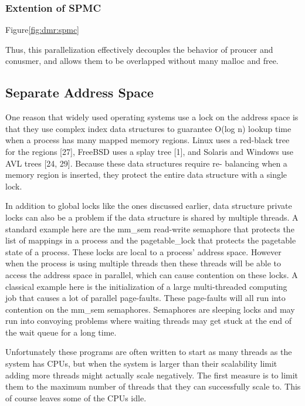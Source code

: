 \subsubsection{Extention of SPMC}
Figure\ref{fig:dmr:spmc}

Thus, this parallelization effectively decouples the behavior of proucer and conusmer, and allows them to be overlapped 
without many malloc and free.




\subsection{Separate Address Space}

One reason that widely used operating systems use a lock on the address space is that 
they use complex index data structures to guarantee O(log n)
lookup time when a process has many mapped memory
regions. Linux uses a red-black tree for the regions [27],
FreeBSD uses a splay tree [1], and Solaris and Windows use
AVL trees [24, 29]. 
Because these data structures require re-
balancing when a memory region is inserted, they protect the
entire data structure with a single lock.


In addition to global locks like the ones discussed earlier, 
data structure private locks can also be a problem 
if the data structure is shared by multiple threads. 
A standard example here are the mm\_sem read-write semaphore 
that protects the list of mappings in a process and 
the pagetable\_lock that protects the pagetable state of a process. 
These locks are local to a process’ address space. 
However when the process is using multiple threads 
then these threads will be able to access the address space in parallel,
which can cause contention on these locks. 
A classical example here is 
the initialization of a large multi-threaded computing job 
that causes a lot of parallel page-faults. 
These page-faults will all run into contention on the mm\_sem semaphores. Semaphores are sleeping locks 
and may run into convoying problems 
where waiting threads may 
get stuck at the end of the wait queue for a long time.\cite{Andi2009lmulticore}

Unfortunately these programs are often written to start as many threads as the system has CPUs, 
but when the system is larger than their scalability limit adding more threads might actually scale negatively.
The first measure is to limit them to the maximum number of threads that they can successfully scale to.
This of course leaves some of the CPUs idle. 




